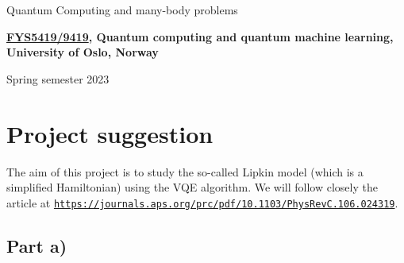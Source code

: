 \documentclass[%
oneside,                 %
final,                   %
10pt]{article}
\begin{document}

\newcommand{\exercisesection}[1]{\subsection*{#1}}






\thispagestyle{empty}

\begin{center}
{\LARGE\bf
\begin{spacing}{1.25}
Quantum Computing and many-body problems
\end{spacing}
}
\end{center}


\begin{center}
{\bf \href{{https://www.uio.no/studier/emner/matnat/fys/FYS5419/index-eng.html}}{FYS5419/9419}, Quantum computing and quantum machine learning, University of Oslo, Norway${}^{}$} \\ [0mm]
\end{center}

\begin{center}
\end{center}
    

\begin{center}
Spring semester 2023
\end{center}

\vspace{1cm}


\section{Project suggestion}

The aim of this project is to study the so-called Lipkin model (which is a simplified Hamiltonian) using the VQE algorithm.
We will follow closely the article at \href{{https://journals.aps.org/prc/pdf/10.1103/PhysRevC.106.024319}}{\nolinkurl{https://journals.aps.org/prc/pdf/10.1103/PhysRevC.106.024319}}. 

\subsection{Part a)}
\end{document}
